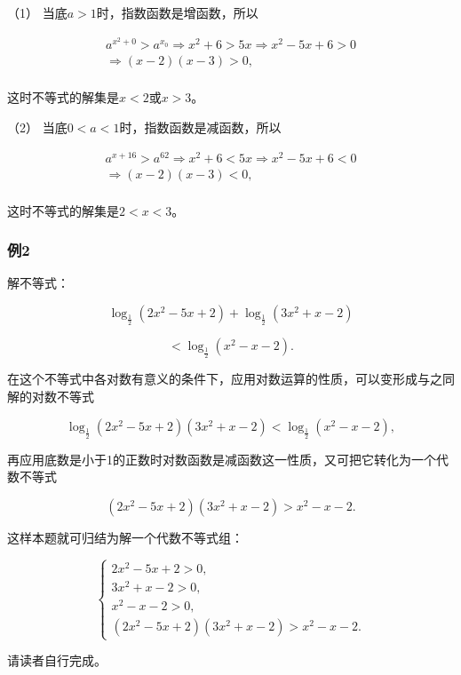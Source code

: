  （1） 当底\(a > 1\)时，指数函数是增函数，所以

\[
\begin{array}{l} a^{x^{2} + 0} > a^{x_{0}} \Rightarrow x^{2} + 6 > 5 x \Rightarrow x^2-5x+6 > 0 \\ \Rightarrow (x - 2) (x - 3) > 0, \\ \end{array}
\]

这时不等式的解集是\(x < 2\)或\(x > 3\)。

（2） 当底\(0 < a < 1\)时，指数函数是减函数，所以

\[
\begin{array}{l} a^{x + 16} > a^{62} \Rightarrow x^{2} + 6 < 5 x \Rightarrow x^2-5x+6 < 0 \\ \Rightarrow (x - 2) (x - 3) < 0, \\ \end{array}
\]

这时不等式的解集是\(2 < x < 3\)。

\subsubsection{例2}

解不等式：

\[
\log_{\frac{1}{2}} (2 x^{2} - 5 x + 2) + \log_{\frac{1}{2}} (3 x^{2} + x - 2)
\]

\[
< \log_{\frac{1}{2}} \left(x^{2} - x - 2\right). \tag {1}
\]

在这个不等式中各对数有意义的条件下，应用对数运算的性质，可以变形成与之同解的对数不等式

\[
\log_{\frac{1}{2}} (2 x^{2} - 5 x + 2) (3 x^{2} + x - 2) < \log_{\frac{1}{2}} (x^{2} - x - 2),
\]

再应用底数是小于1的正数时对数函数是减函数这一性质，又可把它转化为一个代数不等式

\[
(2 x^{2} - 5 x + 2) (3 x^{2} + x - 2) > x^{2} - x - 2.
\]

这样本题就可归结为解一个代数不等式组：

\[
\left\{ \begin{array}{l} 2 x^{2} - 5 x + 2 > 0, \\ 3 x^{2} + x - 2 > 0, \\ x^{2} - x - 2 > 0, \\ (2 x^{2} - 5 x + 2) (3 x^{2} + x - 2) > x^{2} - x - 2. \end{array} \right.
\]

 请读者自行完成。

